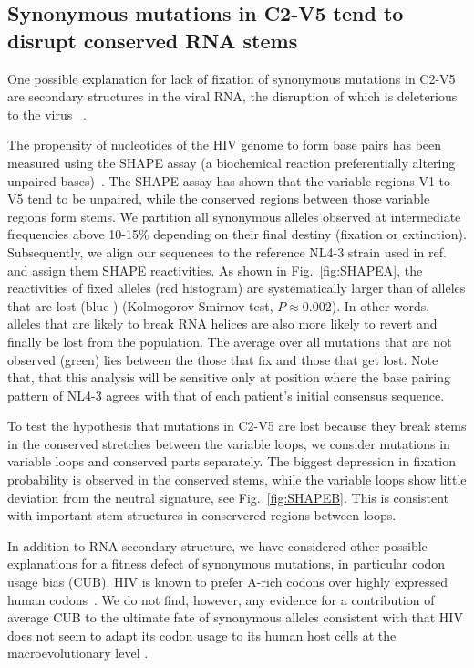 \documentclass[rmp, twocolumn]{revtex4}
\newcommand{\FIG}[1]{Fig.~\ref{fig:#1}}
\begin{document}
\subsection{Synonymous mutations in C2-V5 tend to disrupt conserved RNA stems}
One possible explanation for lack of fixation of synonymous
mutations in C2-V5 are secondary structures in the viral RNA, the disruption of
which is deleterious to the virus
~\citep{forsdyke_reciprocal_1995,snoeck_mapping_2011,sanjuan_interplay_2011}.

The propensity of nucleotides of the HIV genome to form base pairs has
been measured using the SHAPE assay (a biochemical reaction preferentially
altering unpaired bases)~\citep{watts_architecture_2009}. The SHAPE assay has
shown that the variable regions V1 to V5 tend to be unpaired, while the
conserved regions between those variable regions form stems. We partition all
synonymous alleles observed at intermediate frequencies above 10-15\% depending
on their final destiny (fixation or extinction). Subsequently, we align our
sequences to the reference NL4-3 strain used in
ref.~\citep{watts_architecture_2009} and assign them SHAPE reactivities. As
shown in \FIG{SHAPEA}, the reactivities of fixed
alleles (red histogram) are systematically larger than of alleles that are lost
(blue ) (Kolmogorov-Smirnov test, $P\approx 0.002$).
In other words, alleles that are likely to break RNA helices are also more
likely to revert and finally be lost from the population. The
average over all mutations that are not observed (green) lies between the
those that fix and those that get lost.
Note that, that this analysis will be sensitive only at position where the base
pairing pattern of NL4-3 agrees with that of each patient's initial
consensus sequence.

To test the hypothesis that mutations in C2-V5 are lost because they break stems in the
conserved stretches between the variable loops, we consider mutations in
variable loops and conserved parts separately. The biggest depression in
fixation probability is observed in the conserved stems, while the variable
loops show little deviation from the neutral signature, see \FIG{SHAPEB}. This
is consistent with important stem structures in conservered regions between loops.

In addition to RNA secondary structure, we have considered other possible
explanations for a fitness defect of synonymous mutations, in particular codon
usage bias (CUB). HIV is known to prefer A-rich codons over highly expressed
human codons~\citep{jenkins_extent_2003,kuyl_biased_2012}. We do not find,
however, any evidence for a contribution of average CUB to the ultimate fate of
synonymous alleles consistent with that HIV does not seem to adapt its codon
usage to its human host cells at the macroevolutionary level
\citep{kuyl_biased_2012}.
\end{document}
